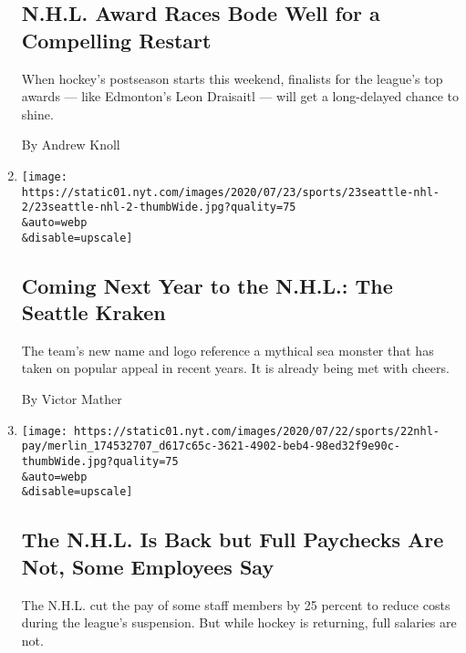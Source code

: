 \begin{enumerate}
  \hypertarget{nhl-award-races-bode-well-for-a-compelling-restart}{%
  \subsection{N.H.L. Award Races Bode Well for a Compelling
  Restart}\label{nhl-award-races-bode-well-for-a-compelling-restart}}

  When hockey's postseason starts this weekend, finalists for the
  league's top awards --- like Edmonton's Leon Draisaitl --- will get a
  long-delayed chance to shine.

  By Andrew Knoll
\item
  \href{/2020/07/23/sports/hockey/seattle-kraken-nhl-team-name.html}{}

  \texttt{[image: https://static01.nyt.com/images/2020/07/23/sports/23seattle-nhl-2/23seattle-nhl-2-thumbWide.jpg?quality=75\\\&auto=webp\\\&disable=upscale]}

  \hypertarget{coming-next-year-to-the-nhl-the-seattle-kraken}{%
  \subsection{Coming Next Year to the N.H.L.: The Seattle
  Kraken}\label{coming-next-year-to-the-nhl-the-seattle-kraken}}

  The team's new name and logo reference a mythical sea monster that has
  taken on popular appeal in recent years. It is already being met with
  cheers.

  By Victor Mather
\item
  \href{/2020/07/22/sports/hockey/nhl-pay-cut-employees-restart.html}{}

  \texttt{[image: https://static01.nyt.com/images/2020/07/22/sports/22nhl-pay/merlin\_174532707\_d617c65c-3621-4902-beb4-98ed32f9e90c-thumbWide.jpg?quality=75\\\&auto=webp\\\&disable=upscale]}

  \hypertarget{the-nhl-is-back-but-full-paychecks-are-not-some-employees-say}{%
  \subsection{The N.H.L. Is Back but Full Paychecks Are Not, Some
  Employees
  Say}\label{the-nhl-is-back-but-full-paychecks-are-not-some-employees-say}}

  The N.H.L. cut the pay of some staff members by 25 percent to reduce
  costs during the league's suspension. But while hockey is returning,
  full salaries are not.


\end{enumerate}
